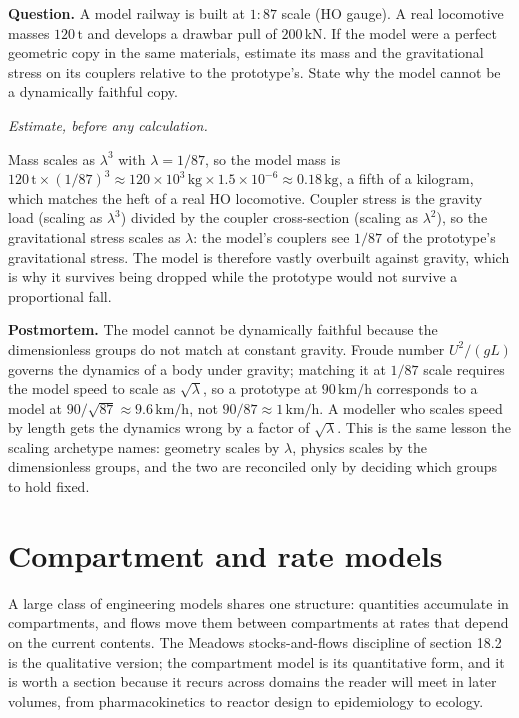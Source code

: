 \begin{estimation}
\textbf{Question.} A model railway is built at $1{:}87$ scale (HO
gauge). A real locomotive masses $120\,\text{t}$ and develops a
drawbar pull of $200\,\text{kN}$. If the model were a perfect
geometric copy in the same materials, estimate its mass and the
gravitational stress on its couplers relative to the prototype's. State
why the model cannot be a dynamically faithful copy.

\smallskip
\textit{Estimate, before any calculation.}

\smallskip
Mass scales as $\lambda^3$ with $\lambda = 1/87$, so the model mass is
$120\,\text{t} \times (1/87)^3 \approx 120 \times 10^3\,\text{kg} \times
1.5\times 10^{-6} \approx 0.18\,\text{kg}$, a fifth of a kilogram, which
matches the heft of a real HO locomotive. Coupler stress is the gravity
load (scaling as $\lambda^3$) divided by the coupler cross-section
(scaling as $\lambda^2$), so the gravitational stress scales as
$\lambda$: the model's couplers see $1/87$ of the prototype's
gravitational stress. The model is therefore vastly overbuilt against
gravity, which is why it survives being dropped while the prototype
would not survive a proportional fall.

\smallskip
\textbf{Postmortem.} The model cannot be dynamically faithful because
the dimensionless groups do not match at constant gravity. Froude number
$U^2/(gL)$ governs the dynamics of a body under gravity; matching it at
$1/87$ scale requires the model speed to scale as $\sqrt{\lambda}$, so a
prototype at $90\,\text{km/h}$ corresponds to a model at
$90/\sqrt{87} \approx 9.6\,\text{km/h}$, not $90/87 \approx
1\,\text{km/h}$. A modeller who scales speed by length gets the dynamics
wrong by a factor of $\sqrt{\lambda}$. This is the same lesson the
scaling archetype names: geometry scales by $\lambda$, physics scales by
the dimensionless groups, and the two are reconciled only by deciding
which groups to hold fixed.
\end{estimation}

\section{Compartment and rate models}

A large class of engineering models shares one structure: quantities
accumulate in compartments, and flows move them between compartments at
rates that depend on the current contents. The Meadows stocks-and-flows
discipline of section 18.2 is the qualitative version; the compartment
model is its quantitative form, and it is worth a section because it
recurs across domains the reader will meet in later volumes, from
pharmacokinetics to reactor design to epidemiology to ecology.

